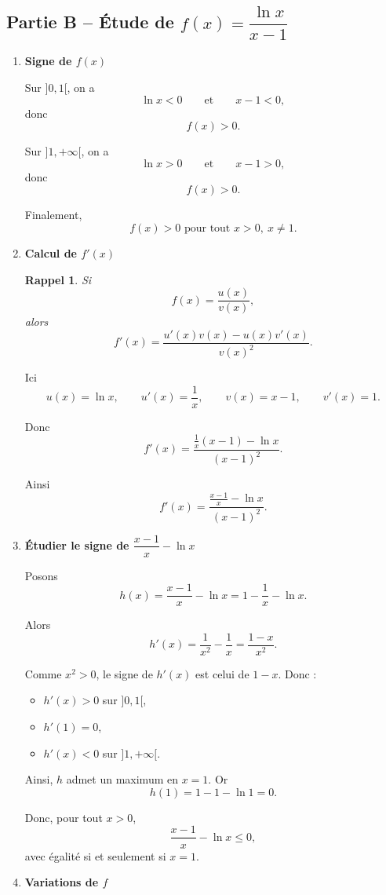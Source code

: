 \documentclass[11pt,a4paper]{article}
\newtheorem*{rappel}{Rappel}
\begin{document}
\subsection*{Partie B -- Étude de \(f(x)=\dfrac{\ln x}{x-1}\)}

\begin{enumerate}[label=\textbf{1.\arabic*}, resume, leftmargin=1.6em]

\item \textbf{Signe de \(f(x)\)}

Sur \(]0,1[\), on a
\[
\ln x<0
\qquad \text{et} \qquad
x-1<0,
\]
donc
\[
f(x)>0.
\]

Sur \(]1,+\infty[\), on a
\[
\ln x>0
\qquad \text{et} \qquad
x-1>0,
\]
donc
\[
f(x)>0.
\]

Finalement,
\[
\boxed{f(x)>0 \text{ pour tout } x>0,\ x\neq 1.}
\]

\item \textbf{Calcul de \(f'(x)\)}

\begin{rappel}
Si
\[
f(x)=\frac{u(x)}{v(x)},
\]
alors
\[
f'(x)=\frac{u'(x)v(x)-u(x)v'(x)}{v(x)^2}.
\]
\end{rappel}

Ici
\[
u(x)=\ln x,\qquad u'(x)=\frac1x,
\qquad
v(x)=x-1,\qquad v'(x)=1.
\]

Donc
\[
f'(x)=\frac{\frac1x(x-1)-\ln x}{(x-1)^2}.
\]

Ainsi
\[
\boxed{
f'(x)=\frac{\frac{x-1}{x}-\ln x}{(x-1)^2}.
}
\]

\item \textbf{Étudier le signe de \(\dfrac{x-1}{x}-\ln x\)}

Posons
\[
h(x)=\frac{x-1}{x}-\ln x=1-\frac1x-\ln x.
\]

Alors
\[
h'(x)=\frac1{x^2}-\frac1x=\frac{1-x}{x^2}.
\]

Comme \(x^2>0\), le signe de \(h'(x)\) est celui de \(1-x\). Donc :
\begin{itemize}
    \item \(h'(x)>0\) sur \(]0,1[\),
    \item \(h'(1)=0\),
    \item \(h'(x)<0\) sur \(]1,+\infty[\).
\end{itemize}

Ainsi, \(h\) admet un maximum en \(x=1\). Or
\[
h(1)=1-1-\ln 1=0.
\]

Donc, pour tout \(x>0\),
\[
\boxed{\frac{x-1}{x}-\ln x\le 0,}
\]
avec égalité si et seulement si \(x=1\).

\item \textbf{Variations de \(f\)}


\end{enumerate}
\end{document}
